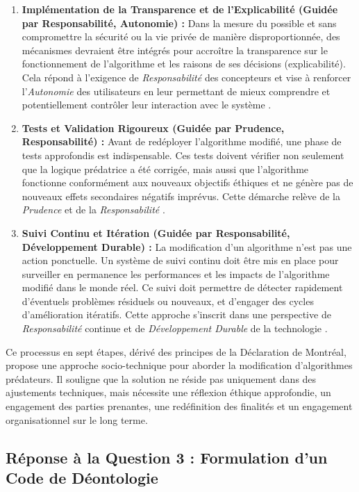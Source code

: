 \documentclass[10pt, twocolumn]{article}
\begin{document}
\begin{enumerate}
    \item \textbf{Implémentation de la Transparence et de l'Explicabilité (Guidée par Responsabilité, Autonomie) :} Dans la mesure du possible et sans compromettre la sécurité ou la vie privée de manière disproportionnée, des mécanismes devraient être intégrés pour accroître la transparence sur le fonctionnement de l'algorithme et les raisons de ses décisions (explicabilité). Cela répond à l'exigence de \textit{Responsabilité} des concepteurs et vise à renforcer l'\textit{Autonomie} des utilisateurs en leur permettant de mieux comprendre et potentiellement contrôler leur interaction avec le système \citep{Montreal2018}.
    \item \textbf{Tests et Validation Rigoureux (Guidée par Prudence, Responsabilité) :} Avant de redéployer l'algorithme modifié, une phase de tests approfondis est indispensable. Ces tests doivent vérifier non seulement que la logique prédatrice a été corrigée, mais aussi que l'algorithme fonctionne conformément aux nouveaux objectifs éthiques et ne génère pas de nouveaux effets secondaires négatifs imprévus. Cette démarche relève de la \textit{Prudence} et de la \textit{Responsabilité} \citep{Montreal2018}.
    \item \textbf{Suivi Continu et Itération (Guidée par Responsabilité, Développement Durable) :} La modification d'un algorithme n'est pas une action ponctuelle. Un système de suivi continu doit être mis en place pour surveiller en permanence les performances et les impacts de l'algorithme modifié dans le monde réel. Ce suivi doit permettre de détecter rapidement d'éventuels problèmes résiduels ou nouveaux, et d'engager des cycles d'amélioration itératifs. Cette approche s'inscrit dans une perspective de \textit{Responsabilité} continue et de \textit{Développement Durable} de la technologie \citep{Montreal2018}.
\end{enumerate}

Ce processus en sept étapes, dérivé des principes de la Déclaration de Montréal, propose une approche socio-technique pour aborder la modification d'algorithmes prédateurs. Il souligne que la solution ne réside pas uniquement dans des ajustements techniques, mais nécessite une réflexion éthique approfondie, un engagement des parties prenantes, une redéfinition des finalités et un engagement organisationnel sur le long terme.

\subsection{Réponse à la Question 3 : Formulation d'un Code de Déontologie}
\end{document}
